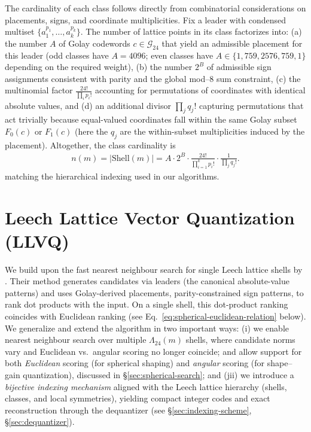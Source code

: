 \documentclass{article}
\theoremstyle{plain}
\theoremstyle{definition}
\theoremstyle{remark}
\begin{document}
The cardinality of each class follows directly from combinatorial considerations
on placements, signs, and coordinate multiplicities. Fix a leader with condensed multiset \(\{a_1^{p_1},\dots,a_k^{p_k}\}\). The number of lattice points in its class factorizes into: (a) the number \(A\) of
Golay codewords \(c \in \mathcal{G}_{24}\) that yield an admissible placement for
this leader (odd classes have \(A=4096\); even classes have \(A\in\{1,759,2576,759,1\}\)
depending on the required weight), (b) the number \(2^{B}\) of admissible sign
assignments consistent with parity and the global mod--\(8\) sum constraint, (c)
the multinomial factor \(\frac{24!}{\prod_i p_i!}\) accounting for permutations of
coordinates with identical absolute values, and (d) an additional divisor
\(\prod_j q_j!\) capturing permutations that act trivially because equal-valued
coordinates fall within the same Golay subset \(F_0(c)\) or \(F_1(c)\) (here the
\(q_j\) are the within-subset multiplicities induced by the placement).  Altogether,
the class cardinality is
{\setlength{\abovedisplayskip}{2pt}
\setlength{\belowdisplayskip}{1pt}
\setlength{\abovedisplayshortskip}{0pt}
\setlength{\belowdisplayshortskip}{1pt} %
\setlength{\jot}{3pt} %
\begin{align}
n(m) = |\text{Shell}(m)| = 
A \cdot 2^{B}
\cdot
\frac{24!}{\prod_{i=1}^k p_i!}
\cdot
\frac{1}{\prod_j q_j!}.
\end{align}
}
matching the hierarchical indexing used in our algorithms.

\section{Leech Lattice Vector Quantization (LLVQ)}
\label{sec:method}

We build upon the fast nearest neighbour search for single Leech lattice shells by \citet{adoul1988nearest}. Their method generates candidates via leaders (the canonical absolute-value patterns) and uses Golay-derived placements, parity-constrained sign patterns, to rank dot products with the input. On a single shell, this dot-product ranking coincides with Euclidean ranking (see Eq.~\ref{eq:spherical-euclidean-relation} below). We generalize and extend the algorithm in two important ways: (i) we enable nearest neighbour search over multiple $\Lambda_{24}(m)$ shells, where candidate norms vary and Euclidean vs.\ angular scoring no longer coincide; and allow support for both \emph{Euclidean} scoring (for spherical shaping) and \emph{angular} scoring (for shape--gain quantization), discussed in \S\ref{sec:spherical-search}; and (jii) we introduce a \emph{bijective indexing mechanism} aligned with the Leech lattice hierarchy (shells, classes, and local symmetries), yielding compact integer codes and exact reconstruction through the dequantizer (see \S\ref{sec:indexing-scheme}, \S\ref{sec:dequantizer}).
\end{document}
